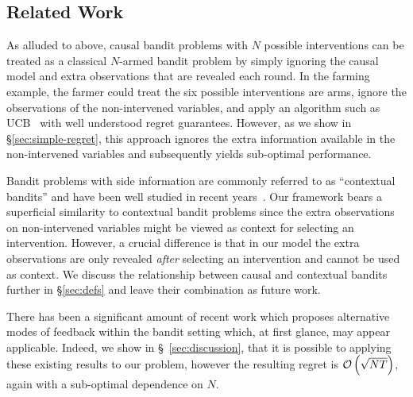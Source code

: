 

\subsection{Related Work}

As alluded to above, causal bandit problems with $N$ possible interventions can be treated as a classical $N$-armed bandit problem by simply ignoring the causal model and extra observations that are revealed each round.
In the farming example, the farmer could treat the six possible interventions are arms, ignore the observations of the non-intervened variables, and apply an algorithm such as UCB~\cite{Auer1995} with well understood regret guarantees.
However, as we show in \S\ref{sec:simple-regret}, this approach ignores the extra information available in the non-intervened variables and subsequently yields sub-optimal performance.

Bandit problems with side information are commonly referred to as ``contextual bandits'' and have been well studied in recent years~\cite{Langford2008,Agarwal2014}.
Our framework bears a superficial similarity to contextual bandit problems since the extra observations on non-intervened variables might be viewed as context for selecting an intervention. 
However, a crucial difference is that in our model the extra observations are only revealed \emph{after} selecting an intervention and cannot be used as context.
We discuss the relationship between causal and contextual bandits further in \S\ref{sec:defs} and leave their combination as future work.

There has been a significant amount of recent work which proposes alternative modes of feedback within the bandit setting \citep{Alon2015} which, at first glance, may appear applicable. Indeed, we show in \S~\ref{sec:discussion}, that it is possible to applying these existing results to our problem, however the resulting regret is $\mathcal{O}\left( \sqrt{NT} \right)$, again with a sub-optimal dependence on $N$.



